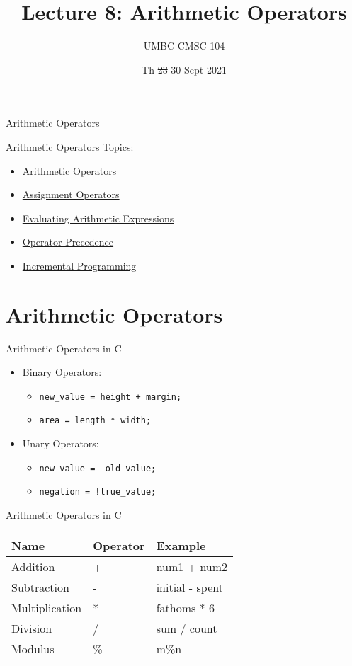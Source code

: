 \documentclass[graphics]{beamer}
\title{Lecture 8: Arithmetic Operators}
\author{UMBC CMSC 104}
\date{Th \sout{23} 30 Sept 2021}
\begin{document}
\begin{frame}{}
\centering
    Arithmetic Operators
\end{frame}

\begin{frame}{Arithmetic Operators}
    Topics:
    \begin{itemize}
        \item \hyperlink{sec:athricop}{Arithmetic Operators}
        \item \hyperlink{sec:assignop}{Assignment Operators}
        \item \hyperlink{sec:evalarithexp}{Evaluating Arithmetic Expressions}
        \item \hyperlink{sec:opprec}{Operator Precedence}
        \item \hyperlink{sec:incprog}{Incremental Programming}
    \end{itemize}
\end{frame}

\section*{Arithmetic Operators}\label{sec:athricop}
\begin{frame}{Arithmetic Operators in C}
    \begin{itemize}
        \item Binary Operators:
        \begin{itemize}
            \item \texttt{new\_value = height + margin;}
            \item \texttt{area = length * width;}
        \end{itemize}
        \item Unary Operators:
        \begin{itemize}
            \item \texttt{new\_value = -old\_value;}
            \item \texttt{negation = !true\_value;}
        \end{itemize}
    \end{itemize}
\end{frame}

\begin{frame}{Arithmetic Operators in C}
    \begin{tabular}{l l l}
        Name & Operator & Example  \\ \hline
        Addition & + & num1 + num2 \\
        Subtraction & - & initial - spent \\
        Multiplication & * & fathoms * 6 \\
        Division & / & sum / count \\
        Modulus & \% & m\%n
    \end{tabular}
\end{frame}
\end{document}

